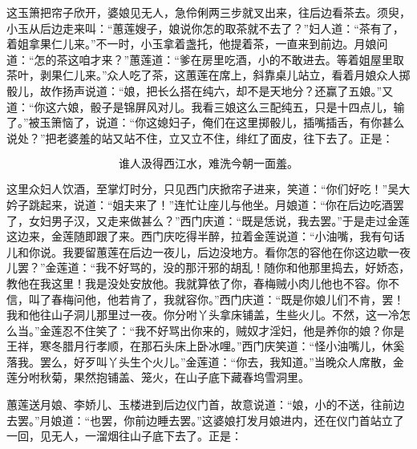 这玉箫把帘子欣开，婆娘见无人，急伶俐两三步就叉出来，往后边看茶去。须臾，小玉从后边走来叫：“蕙莲嫂子，娘说你怎的取茶就不去了？”妇人道：“茶有了，着姐拿果仁儿来。”不一时，小玉拿着盏托，他提着茶，一直来到前边。月娘问道：“怎的茶这咱才来？”蕙莲道：“爹在房里吃酒，小的不敢进去。等着姐屋里取茶叶，剥果仁儿来。”众人吃了茶，这蕙莲在席上，斜靠桌儿站立，看着月娘众人掷骰儿，故作扬声说道：“娘，把长么搭在纯六，却不是天地分？还赢了五娘。”又道：“你这六娘，骰子是锦屏风对儿。我看三娘这么三配纯五，只是十四点儿，输了。”被玉箫恼了，说道：“你这媳妇子，俺们在这里掷骰儿，插嘴插舌，有你甚么说处？”把老婆羞的站又站不住，立又立不住，绯红了面皮，往下去了。正是：

\[
谁人汲得西江水，难洗今朝一面羞。
\]

这里众妇人饮酒，至掌灯时分，只见西门庆掀帘子进来，笑道：“你们好吃！”吴大妗子跳起来，说道：“姐夫来了！”连忙让座儿与他坐。月娘道：“你在后边吃酒罢了，女妇男子汉，又走来做甚么？”西门庆道：“既是恁说，我去罢。”于是走过金莲这边来，金莲随即跟了来。西门庆吃得半醉，拉着金莲说道：“小油嘴，我有句话儿和你说。我要留蕙莲在后边一夜儿，后边没地方。看你怎的容他在你这边歇一夜儿罢？”金莲道：“我不好骂的，没的那汗邪的胡乱！随你和他那里捣去，好娇态，教他在我这里！我是没处安放他。我就算依了你，春梅贼小肉儿他也不容。你不信，叫了春梅问他，他若肯了，我就容你。”西门庆道：“既是你娘儿们不肯，罢！我和他往山子洞儿那里过一夜。你分咐丫头拿床铺盖，生些火儿。不然，这一冷怎么当。”金莲忍不住笑了：“我不好骂出你来的，贼奴才淫妇，他是养你的娘？你是王祥，寒冬腊月行孝顺，在那石头床上卧冰哩。”西门庆笑道：“怪小油嘴儿，休奚落我。罢么，好歹叫丫头生个火儿。”金莲道：“你去，我知道。”当晚众人席散，金莲分咐秋菊，果然抱铺盖、笼火，在山子底下藏春坞雪洞里。

蕙莲送月娘、李娇儿、玉楼进到后边仪门首，故意说道：“娘，小的不送，往前边去罢。”月娘道：“也罢，你前边睡去罢。”这婆娘打发月娘进内，还在仪门首站立了一回，见无人，一溜烟往山子底下去了。正是：


